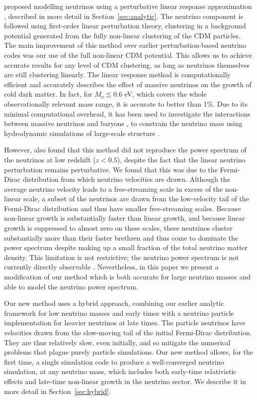 \documentclass[useAMS, usenatbib]{mnras}
\begin{document}
\cite{AHB} proposed modelling neutrinos using a perturbative linear response approximation \citep{Bond_1980, Ma_1994}, described in more detail in Section~\ref{sec:analytic}. The neutrino component is followed using first-order linear perturbation theory, clustering in a background potential generated from the fully non-linear clustering of the CDM particles. The main improvement of this method over earlier perturbation-based neutrino codes \citep{Brandbyge_2009} was our use of the full non-linear CDM potential. This allows us to achieve accurate results for any level of CDM clustering, as long as neutrinos themselves are still clustering linearly.
The linear response method is computationally efficient and accurately describes the effect of massive neutrinos on the growth of cold dark matter.
In fact, for $M_\nu \lesssim 0.6$ eV, which covers the whole observationally relevant mass range, it is accurate to better than 1\%. Due to its minimal computational overhead,
it has been used to investigate the interactions between massive neutrinos and baryons \citep{Mummery_2017}, to constrain
the neutrino mass using hydrodynamic simulations of large-scale structure \citep{McCarthy_2017, McCarthy_2018}.

However, \cite{AHB} also found that this method did not reproduce the power spectrum of the neutrinos at low redshift ($z < 0.5$), despite the fact that the linear neutrino perturbation remains perturbative.
We found that this was due to the Fermi-Dirac distribution from which neutrino velocities are drawn. Although the average neutrino velocity leads to a free-streaming scale in excess of the non-linear scale, a subset of the neutrinos are drawn from the low-velocity tail of the Fermi-Dirac distribution and thus have smaller free-streaming scales. Because non-linear growth is substantially faster than linear growth, and because linear growth is suppressed to almost zero on these scales, these neutrinos cluster substantially more than their faster brethren and thus come to dominate the power spectrum despite making up a small fraction of the total neutrino matter density.
This limitation is not restrictive; the neutrino power spectrum is not currently directly observable \citep[but see][]{Ptolemy}.
Nevertheless, in this paper we present a modification of our method which is both accurate for large neutrino masses and able to model the neutrino power spectrum.

Our new method uses a hybrid approach, combining our earlier analytic framework for low neutrino masses and early times with a neutrino particle implementation for
heavier neutrinos at late times. The particle neutrinos have velocities drawn from the slow-moving tail of the initial Fermi-Dirac distribution. They are thus relatively slow,
even initially, and so mitigate the numerical problems that plague purely particle simulations. Our new method allows, for the first time, a single simulation code to produce a well-converged neutrino simulation, at any neutrino mass, which includes both early-time relativistic effects and late-time non-linear growth in the neutrino sector. We describe it in more detail in Section~\ref{sec:hybrid}.
\end{document}

